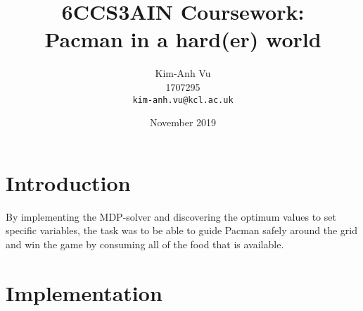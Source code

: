 \documentclass[12pt]{report}
\title{6CCS3AIN Coursework: \\ Pacman in a hard(er) world}
\author{
  Kim-Anh Vu\\1707295\\
  \texttt{kim-anh.vu@kcl.ac.uk}
}
\date{November 2019}
\begin{document}
  \begin{titlepage}
    \maketitle
  \end{titlepage}
  \section*{Introduction}
    By implementing the MDP-solver and discovering the optimum values to set specific
    variables, the task was to be able to guide Pacman safely around the grid and
    win the game by consuming all of the food that is available.

    \section*{Implementation}
\end{document}
